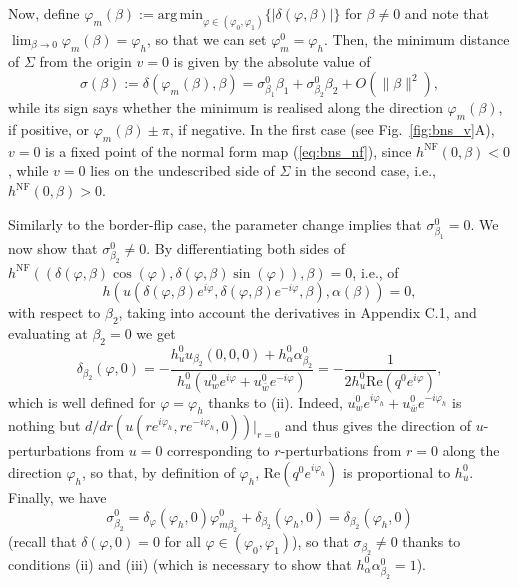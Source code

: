 \documentclass[final,onefignum]{siamltex}
\begin{document}
Now, define
$\varphi_m(\beta):=\mathrm{arg\,min}_{\varphi\in(\varphi_0,\varphi_1)}
\{|\delta(\varphi,\beta)|\}$ for $\beta\neq 0$ and note that
$\lim_{\beta\to 0}\varphi_m(\beta)=\varphi_h$, so that we can set
$\varphi_m^0=\varphi_h$.
Then, the minimum distance of $\Sigma$ from the origin $v=0$ is given by
the absolute value of
$$
\sigma(\beta):=\delta(\varphi_m(\beta),\beta)=
\sigma_{\beta_1}^0\beta_1+\sigma_{\beta_2}^0\beta_2+O(\|\beta\|^2),
$$
while its sign says whether the minimum is realised along the direction
$\varphi_m(\beta)$, if positive, or $\varphi_m(\beta)\pm\pi$, if negative.
In the first case (see Fig.~\ref{fig:bns_v}A), $v=0$ is a fixed point of the
normal form map (\ref{eq:bns_nf}), since $h^{\mathrm{NF}}(0,\beta)<0$,
while $v=0$ lies on the undescribed side of $\Sigma$ in the second case,
i.e., $h^{\mathrm{NF}}(0,\beta)>0$.

Similarly to the border-flip case, the parameter change implies that $\sigma_{\beta_1}^0=0$.  We now show that $\sigma_{\beta_2}^0\neq 0$.  By differentiating both sides of
$h^{\mathrm{NF}}((\delta(\varphi,\beta)\cos(\varphi),
\delta(\varphi,\beta)\sin(\varphi)),\beta)=0$, i.e., of
$$
h(u(\delta(\varphi,\beta)e^{i\varphi},
\delta(\varphi,\beta)e^{-i\varphi},\beta),\alpha(\beta))=0,
$$
with respect to $\beta_2$, taking into account the derivatives in Appendix C.1, and evaluating at $\beta_2=0$ we get
$$
\delta_{\beta_2}(\varphi,0)=
-{\displaystyle \frac{\displaystyle {h_u^0u_{\beta_2}(0,0,0)+
h_{\alpha}^0\alpha_{\beta_2}^0}}{\displaystyle {h_u^0(u_{w}^0e^{i\varphi}+u_{\bar{w}}^0e^{-i\varphi})}}}=
-{\displaystyle \frac{\displaystyle {1}}{\displaystyle {2h_u^0\mathrm{Re}(q^0e^{i\varphi})}}},
$$
which is well defined for $\varphi=\varphi_h$ thanks to (ii).
Indeed,
$u_{w}^0e^{i\varphi_h}+u_{\bar{w}}^0e^{-i\varphi_h}$ is nothing
but \linebreak $d/dr(u(re^{i\varphi_h},re^{-i\varphi_h},0))|_{r=0}$ and thus gives the
direction of $u$-perturbations from $u=0$ corresponding to $r$-perturbations
from $r=0$ along the direction $\varphi_h$, so that,
by definition of $\varphi_h$,
$\mathrm{Re}(q^0e^{i\varphi_h})$ is proportional to $h_u^0$.
Finally, we have
$$
\sigma_{\beta_2}^0=\delta_{\varphi}(\varphi_h,0)
\varphi_{m\beta_2}^0+\delta_{\beta_2}(\varphi_h,0)=
\delta_{\beta_2}(\varphi_h,0)
$$
(recall that $\delta(\varphi,0)=0$ for all $\varphi\in(\varphi_0,\varphi_1)$), so that $\sigma_{\beta_2}\neq0$ thanks to conditions (ii) and (iii) (which is necessary to show that $h_\alpha^0\alpha_{\beta_2}^0=1$).
\end{document}
